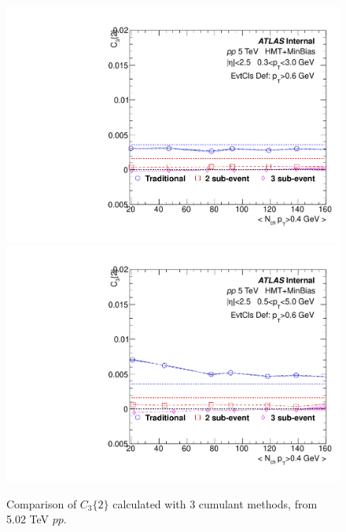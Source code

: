 \begin{figure}[p]
\includegraphics[width=0.4\linewidth]{figs/sec_result/pp5/phy_2PC_Har1_Pt0_Cls3.pdf}
\includegraphics[width=0.4\linewidth]{figs/sec_result/pp5/phy_2PC_Har1_Pt1_Cls3.pdf}
\caption{Comparison of $C_{3}\{2\}$ calculated with 3 cumulant methods, from 5.02 TeV $pp$.}
\label{fig:result_pp5_C32}
\end{figure}
\clearpage

